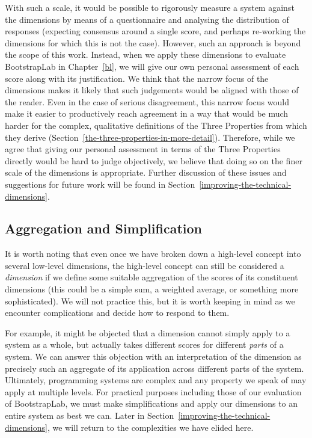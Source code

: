 \documentclass[ twoside,openright,titlepage,numbers=noenddot,headinclude,footinclude,cleardoublepage=empty,abstract=on,
                BCOR=5mm,paper=a4,fontsize=11pt
                ]{scrreprt}
\theoremstyle{definition}
\begin{document}
With such a scale, it would be possible to rigorously measure a system
against the dimensions by means of a questionnaire and analysing the
distribution of responses (expecting consensus around a single score,
and perhaps re-working the dimensions for which this is not the case).
However, such an approach is beyond the scope of this work. Instead,
when we apply these dimensions to evaluate BootstrapLab in
Chapter~\ref{bl}, we will give our own personal assessment of each score
along with its justification. We think that the narrow focus of the
dimensions makes it likely that such judgements would be aligned with
those of the reader. Even in the case of serious disagreement, this
narrow focus would make it easier to productively reach agreement in a
way that would be much harder for the complex, qualitative definitions
of the Three Properties from which they derive
(Section~\ref{the-three-properties-in-more-detail}). Therefore, while we
agree that giving our personal assessment in terms of the Three
Properties directly would be hard to judge objectively, we believe that
doing so on the finer scale of the dimensions is appropriate. Further
discussion of these issues and suggestions for future work will be found
in Section~\ref{improving-the-technical-dimensions}.

\hypertarget{aggregation-and-simplification}{\subsection{Aggregation and
Simplification}\label{aggregation-and-simplification}}

It is worth noting that even once we have broken down a high-level
concept into several low-level dimensions, the high-level concept can
still be considered a \emph{dimension} if we define some suitable
aggregation of the scores of its constituent dimensions (this could be a
simple sum, a weighted average, or something more sophisticated). We
will not practice this, but it is worth keeping in mind as we encounter
complications and decide how to respond to them.

For example, it might be objected that a dimension cannot simply apply
to a system as a whole, but actually takes different scores for
different \emph{parts} of a system. We can answer this objection with an
interpretation of the dimension as precisely such an aggregate of its
application across different parts of the system. Ultimately,
programming systems are complex and any property we speak of may apply
at multiple levels. For practical purposes including those of our
evaluation of BootstrapLab, we must make simplifications and apply our
dimensions to an entire system as best we can. Later in
Section~\ref{improving-the-technical-dimensions}, we will return to the
complexities we have elided here.
\end{document}
